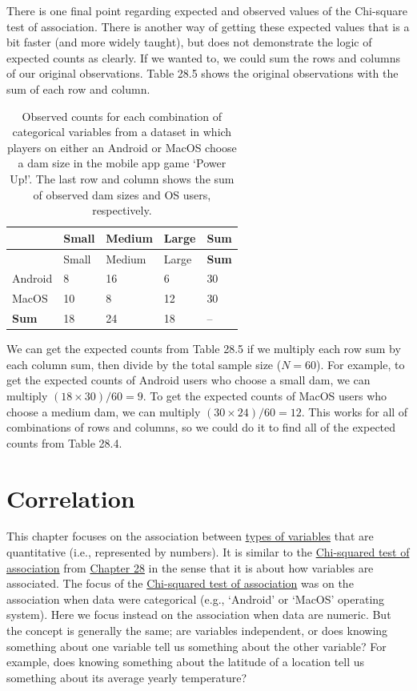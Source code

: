\documentclass[
]{scrbook}
\begin{document}
There is one final point regarding expected and observed values of the Chi-square test of association.
There is another way of getting these expected values that is a bit faster (and more widely taught), but does not demonstrate the logic of expected counts as clearly.
If we wanted to, we could sum the rows and columns of our original observations.
Table 28.5 shows the original observations with the sum of each row and column.

\begin{longtable}[]{@{}lllll@{}}
\caption{\label{tab:unnamed-chunk-142}Observed counts for each combination of categorical variables from a dataset in which players on either an Android or MacOS choose a dam size in the mobile app game `Power Up!'. The last row and column shows the sum of observed dam sizes and OS users, respectively.}\tabularnewline
\toprule
& Small & Medium & Large & \textbf{Sum} \\
\midrule
\endfirsthead
\toprule
& Small & Medium & Large & \textbf{Sum} \\
\midrule
\endhead
Android & 8 & 16 & 6 & 30 \\
MacOS & 10 & 8 & 12 & 30 \\
\textbf{Sum} & 18 & 24 & 18 & -- \\
\bottomrule
\end{longtable}

We can get the expected counts from Table 28.5 if we multiply each row sum by each column sum, then divide by the total sample size (\(N = 60\)).
For example, to get the expected counts of Android users who choose a small dam, we can multiply \((18 \times 30)/60 = 9\).
To get the expected counts of MacOS users who choose a medium dam, we can multiply \((30 \times 24)/60 = 12\).
This works for all of combinations of rows and columns, so we could do it to find all of the expected counts from Table 28.4.

\hypertarget{Chapter_29}{%
\chapter{Correlation}\label{Chapter_29}}

This chapter focuses on the association between \protect\hyperlink{Chapter_5}{types of variables} that are quantitative (i.e., represented by numbers).
It is similar to the \protect\hyperlink{chi-squared-test-of-association}{Chi-squared test of association} from \protect\hyperlink{Chapter_28}{Chapter 28} in the sense that it is about how variables are associated.
The focus of the \protect\hyperlink{chi-squared-test-of-association}{Chi-squared test of association} was on the association when data were categorical (e.g., `Android' or `MacOS' operating system).
Here we focus instead on the association when data are numeric.
But the concept is generally the same; are variables independent, or does knowing something about one variable tell us something about the other variable?
For example, does knowing something about the latitude of a location tell us something about its average yearly temperature?
\end{document}
